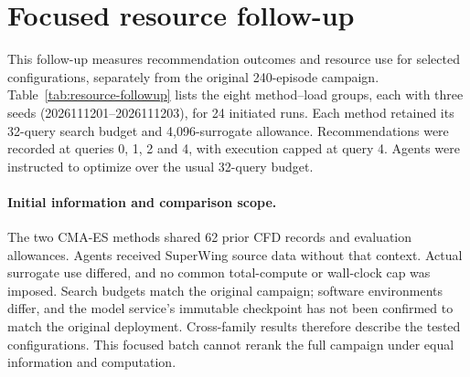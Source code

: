 \section{Focused resource follow-up}
\label{app:resource-followup}

This follow-up measures recommendation outcomes and resource use for selected
configurations, separately from the original 240-episode campaign.
Table~\ref{tab:resource-followup} lists the eight method--load groups, each
with three seeds (2026111201--2026111203), for 24 initiated runs. Each method
retained its 32-query search budget and 4{,}096-surrogate allowance.
Recommendations were recorded at queries 0, 1, 2 and 4, with execution capped
at query 4. Agents were instructed to optimize over the usual 32-query budget.

\paragraph{Initial information and comparison scope.}
The two CMA-ES methods shared 62 prior CFD records and evaluation allowances.
Agents received SuperWing source data without that context. Actual surrogate
use differed, and no common total-compute or wall-clock cap was imposed.
Search budgets match the original campaign; software environments differ,
and the model service's immutable checkpoint has not been confirmed to match
the original deployment. Cross-family results therefore describe the tested
configurations. This focused batch cannot rerank the full campaign under
equal information and computation.

